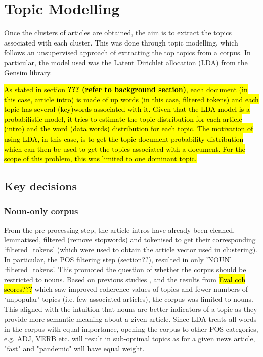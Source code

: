 


\section{Topic Modelling}

Once the clusters of articles are obtained, the aim is to extract the topics associated with each cluster. This was done through topic modelling, which follows an unsupervised approach of extracting the top topics from a corpus. In particular, the model used was the Latent Dirichlet allocation (LDA) from the Gensim library. 

\hl{As stated in section \textbf{??? (refer to background section)}, each document (in this case, article intro) is made of up words (in this case, filtered tokens) and each topic has several (key)words associated with it. Given that the LDA model is a probabilistic model, it tries to estimate the topic distribution for each article (intro) and the word (data words) distribution for each topic. The motivation of using LDA, in this case, is to get the topic-document probability distribution which can then be used to get the topics associated with a document. For the scope of this problem, this was limited to one dominant topic.}
\subsection{Key decisions}
\subsubsection{Noun-only corpus}
From the pre-processing step, the article intros have already been cleaned, lemmatised, filtered (remove stopwords) and tokenised to get their corresponding ‘filtered\_tokens’ (which were used to obtain the article vector used in clustering). In particular, the POS filtering step (section??), resulted in only 'NOUN' ‘filtered\_tokens’. This promoted the question of whether the corpus should be restricted to nouns. Based on previous studies \cite{nouns_only_lda} \cite{efficient_noun_only_approach}, and the results from \hl{Eval coh scores???} which saw improved coherence values of topics and fewer numbers of ‘unpopular' topics (i.e. few associated articles), the corpus was limited to nouns. This aligned with the intuition that nouns are better indicators of a topic as they provide more semantic meaning about a given article. Since LDA treats all words in the corpus with equal importance, opening the corpus to other POS categories, e.g. ADJ, VERB etc. will result in sub-optimal topics as for a given news article, "fast" and "pandemic" will have equal weight. 


